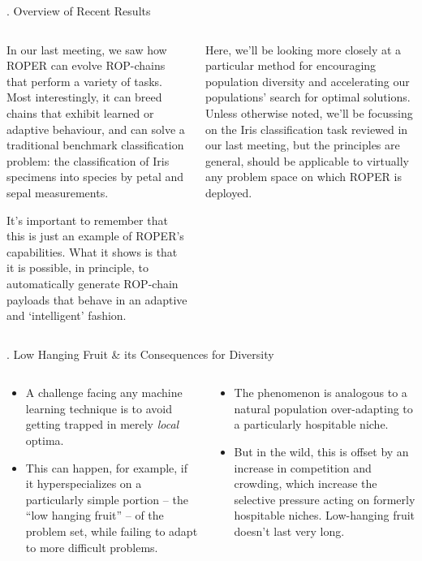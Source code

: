 \documentclass[9pt]{beamer}
\begin{document}
\begin{frame}{\theframenumber. Overview of Recent Results}
\begin{columns}
\begin{column}{.5\textwidth}
      In our last meeting, we saw how ROPER can evolve ROP-chains that perform a variety of tasks. Most interestingly, it can breed chains that exhibit learned or adaptive behaviour, and can solve a traditional benchmark classification problem: the classification of Iris specimens into species by petal and sepal measurements. 
      \vspace{8pt}

      It's important to remember that this is just an example of ROPER's capabilities. What it shows is that it is possible, in principle, to automatically generate ROP-chain payloads that behave in an adaptive and `intelligent' fashion.
    \end{column}
    \begin{column}{.5\textwidth}
      Here, we'll be looking more closely at a particular method for encouraging population diversity and accelerating our populations' search for optimal solutions. Unless otherwise noted, we'll be focussing on the Iris classification task reviewed in our last meeting, but the principles are general, should be applicable to virtually any problem space on which ROPER is deployed.  
    \end{column}
    \end{columns}
\end{frame}


\begin{frame}{\theframenumber. Low Hanging Fruit \& its Consequences for Diversity}
  \begin{columns}
    \begin{column}{.5\textwidth}
      \begin{itemize}
      \item A challenge facing any machine learning technique is to
      avoid getting trapped in merely \emph{local} optima.

      \item This can happen, for example, if
        it hyperspecializes on a particularly simple portion 
        -- the ``low hanging fruit'' -- of the problem set,
        while failing to adapt to more difficult problems.

      \end{itemize}
    \end{column}
    \begin{column}{.5\textwidth}
      \begin{itemize}
      \item The phenomenon is analogous to a natural population
        over-adapting to a particularly hospitable niche.
      \item But in the wild, this is
        offset by an increase in competition and crowding,
        which increase the selective pressure acting on formerly
        hospitable niches. Low-hanging fruit doesn't last very long.
      \end{itemize}
    \end{column}
    \end{columns}
\end{frame}
\end{document}
